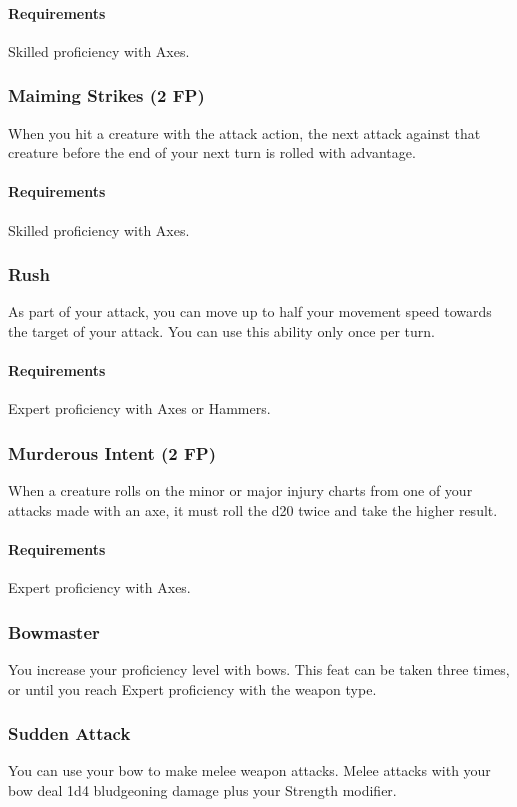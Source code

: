     \paragraph{Requirements} Skilled proficiency with Axes.
\subsubsection{Maiming Strikes (2 FP)} \label{feat::maimingstrikes}
    When you hit a creature with the attack action, the next attack against that creature before the end of your next turn is rolled with advantage.
    \paragraph{Requirements} Skilled proficiency with Axes.
\subsubsection{Rush} \label{feat::rush}
    As part of your attack, you can move up to half your movement speed towards the target of your attack.
    You can use this ability only once per turn.
    \paragraph{Requirements} Expert proficiency with Axes or Hammers.
\subsubsection{Murderous Intent (2 FP)} \label{feat::murderousintent}
    When a creature rolls on the minor or major injury charts from one of your attacks made with an axe, it must roll the d20 twice and take the higher result.
    \paragraph{Requirements} Expert proficiency with Axes.
\subsubsection{Bowmaster} \label{feat::bowmaster}
    You increase your proficiency level with bows.
    This feat can be taken three times, or until you reach Expert proficiency with the weapon type.
\subsubsection{Sudden Attack} \label{feat::suddenattack}
    You can use your bow to make melee weapon attacks.
    Melee attacks with your bow deal 1d4 bludgeoning damage plus your Strength modifier.

